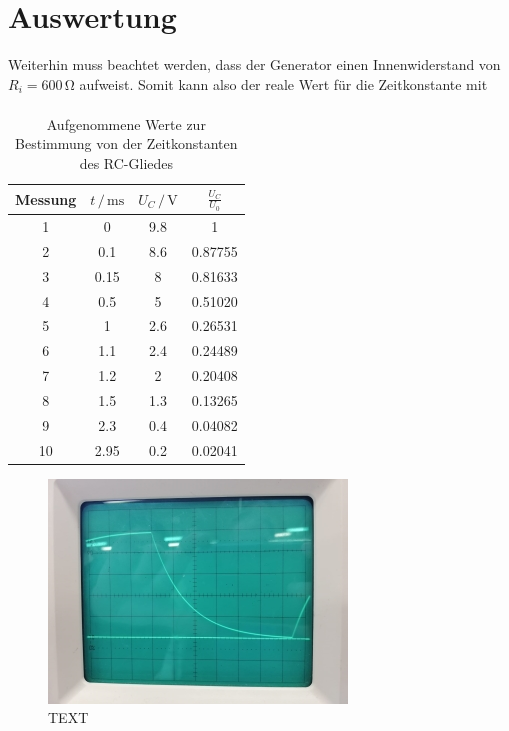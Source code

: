 \section{Auswertung}
\label{sec:Auswertung}

 Weiterhin muss beachtet werden, dass der Generator einen Innenwiderstand
von $R_i = 600\, \si{\ohm}$ aufweist.
Somit kann also der reale Wert für die Zeitkonstante mit 
\begin{align}

\end{align}




\begin{table}[H]
\normalsize

\centering
{}
\begin{tabular}{c c c c}
\toprule
        Messung & $t \,/\,\si{\milli\second}$ & $U_C \,/\,\si{\volt}$ & $\frac{U_C}{U_0}$ \\
        \midrule

1   & 0      &  9.8   &    1       \\
2   & 0.1    &  8.6   & 0.87755    \\
3   & 0.15   &   8    & 0.81633    \\
4   & 0.5    &   5    & 0.51020    \\
5   & 1      &  2.6   & 0.26531    \\
6   & 1.1    &  2.4   & 0.24489    \\
7   & 1.2    &   2    & 0.20408    \\
8   & 1.5    &  1.3   & 0.13265    \\
9   & 2.3    &  0.4   & 0.04082    \\
10  & 2.95   &  0.2   & 0.02041    \\



     
        

        
\bottomrule
\end{tabular}
\caption{Aufgenommene Werte zur Bestimmung von der Zeitkonstanten des RC-Gliedes}
\label{tab:1}
\end{table}


\begin{figure}
  \centering
  \includegraphics{content/ErsterTeil.jpg}
  \caption{TEXT}
  \label{fig:ErsterTeil}
\end{figure}


